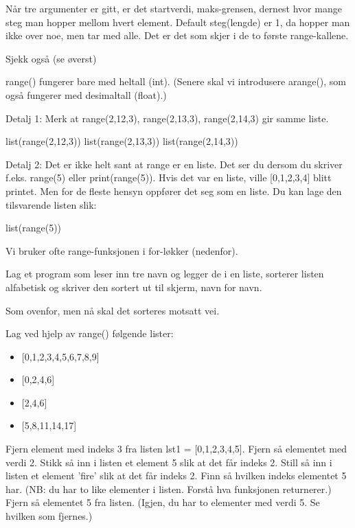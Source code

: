 {Når tre argumenter er gitt, er det startverdi, maks-grensen, dernest hvor mange steg man hopper mellom hvert element. Default steg(lengde) er 1, da hopper man ikke over noe, men tar med alle. Det er det som skjer i de to første range-kallene. 

Sjekk også 
(se øverst) 

range() fungerer bare med heltall (int). (Senere skal vi introdusere arange(), som også fungerer med desimaltall (float).) 

Detalj 1: Merk at range(2,12,3), range(2,13,3), range(2,14,3) gir samme liste.
\begin{usncodebox}
list(range(2,12,3))
list(range(2,13,3))
list(range(2,14,3))
\end{usncodebox}

Detalj 2: Det er ikke helt sant at range er en liste. Det ser du dersom du skriver f.eks. range(5) eller print(range(5)). Hvis det var en liste, ville [0,1,2,3,4] blitt printet. Men for de fleste hensyn oppfører det seg som en liste. Du kan lage den tilsvarende listen slik:
\begin{usncodebox}
list(range(5))
\end{usncodebox}

Vi bruker ofte range-funksjonen i for-løkker (nedenfor). 

\begin{question}
Lag et program som leser inn tre navn og legger de i en liste, sorterer listen alfabetisk og skriver den sortert ut til skjerm, navn for navn. 
\end{question}

\begin{question}
Som ovenfor, men nå skal det sorteres motsatt vei. 
\end{question}

\begin{question}
Lag ved hjelp av range() følgende lister:
\begin{itemize}
\item {[0,1,2,3,4,5,6,7,8,9]}
\item {[0,2,4,6]}
\item {[2,4,6]}
\item {[5,8,11,14,17]}
\end{itemize}
\end{question}

\begin{question}
Fjern element med indeks 3 fra listen lst1 = [0,1,2,3,4,5]. Fjern så elementet med verdi 2. Stikk så inn i listen et element 5 slik at det får indeks 2. Still så inn i listen et element 'fire' slik at det får indeks 2. Finn så hvilken indeks elementet 5 har. (NB: du har to like elementer i listen. Forstå hva funksjonen returnerer.) Fjern så elementet 5 fra listen. (Igjen, du har to elementer med verdi 5. Se hvilken som fjernes.)
\end{question}

}
